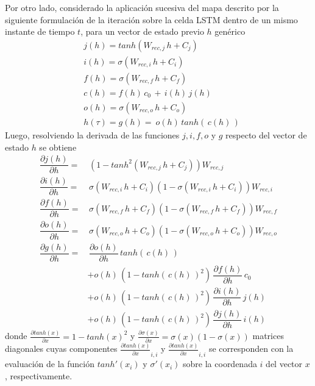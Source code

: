\documentclass{article}
\begin{document}
\begin{appendices}
		Por otro lado, considerado la aplicación sucesiva del mapa descrito por la siguiente formulación de la iteración sobre la celda LSTM dentro de un mismo instante de tiempo $t$, para un vector de estado previo $h$ genérico
		\begin{equation*}
		\begin{split}
		&j(h) = tanh(W_{rec,j} \, h + C_j)\\
		&i(h) = \sigma(W_{rec,i} \, h + C_i)\\
		&f(h) = \sigma(W_{rec,f} \, h + C_f)\\
		&c(h) = f(h) \, c_0 \,+\, i(h) \, j(h)\\
		&o(h) = \sigma(W_{rec,o} \, h + C_o)\\
		&h(\tau) = g(h) = \: o(h) \, tanh( \,c(h)\,)
		\end{split}
		\end{equation*}
		Luego, resolviendo la derivada de las funciones $j, i, f, o$ y $g$ respecto del vector de estado $h$ se obtiene
		\begin{equation*}
		\begin{split}
		\dfrac{\partial j(h)}{\partial h} = & \, (1- tanh^2(W_{rec,j} \, h + C_j))W_{rec,j}\\
		\dfrac{\partial i(h)}{\partial h} = & \, \sigma(W_{rec,i} \, h + C_i) (1-\sigma(W_{rec,i} \, h + C_i)) W_{rec,i}\\
		\dfrac{\partial f(h)}{\partial h} = & \, \sigma(W_{rec,f} \, h + C_f) (1-\sigma(W_{rec,f} \, h + C_f)) W_{rec,f}\\
		\dfrac{\partial o(h)}{\partial h} = & \, \sigma(W_{rec,o} \, h + C_o) (1-\sigma(W_{rec,o} \, h + C_o)) W_{rec,o}\\
		\dfrac{\partial g(h)}{\partial h} = & \, \dfrac{\partial o(h)}{\partial h} \, tanh( \, c(h) \, )\\
		&+ o(h) \, (1 - tanh( \, c(h) \, )^2) \, \dfrac{\partial f(h)}{\partial h} \, c_0\\
		&+ o(h) \, (1 - tanh( \, c(h) \, )^2) \, \dfrac{\partial i(h)}{\partial h} \, j(h)\\
		&+ o(h) \, (1 - tanh( \, c(h) \, )^2) \, \dfrac{\partial j(h)}{\partial h} \, i(h)
		\end{split}
		\end{equation*}
		donde $\frac{\partial tanh(x)}{\partial x} = 1 - tanh(x)^2$ y $\frac{\partial \sigma(x)}{\partial x} = \sigma(x) (1-\sigma(x))$ matrices diagonales cuyas componentes $\frac{\partial tanh(x)}{\partial x}_{i,i}$ y $\frac{\partial tanh(x)}{\partial x}_{i,i}$ se corresponden con la evaluación de la función $tanh'(x_i)$ y $\sigma'(x_i)$ sobre la coordenada $i$ del vector $x$, respectivamente.\\
		

\end{appendices}
\end{document}
